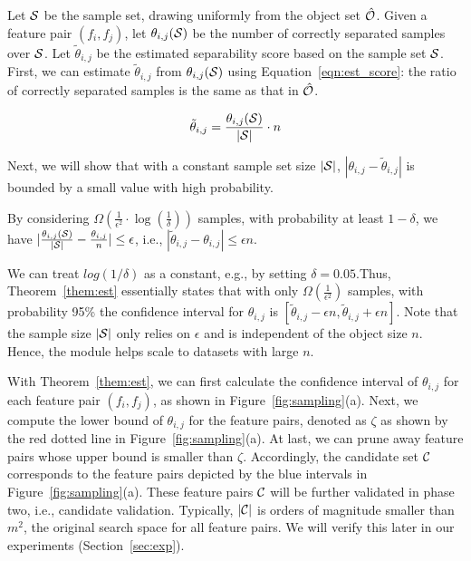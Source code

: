 Let $\sss$ be the sample set, drawing uniformly from the object set $\hat{\oo}$. Given a feature pair $(f_i,f_j)$, let $\theta_{i,j}(\sss)$ be the number of correctly separated samples over $\sss$. Let $\tilde{\theta}_{i,j}$ be the estimated separability score based on the sample set $\sss$. First, we can estimate $\tilde{\theta}_{i,j}$ from $\theta_{i,j}(\sss)$ using Equation~\ref{eqn:est_score}: the ratio of correctly separated samples is the same as that in $\hat{\oo}$. 

\begin{equation}\label{eqn:est_score}
\tilde{\theta}_{i,j} = \frac{\theta_{i,j}(\sss)}{|\sss|} \cdot n
\end{equation}

Next, we will show that with a constant sample set size $|\sss|$, $|\theta_{i,j}-\tilde{\theta}_{i,j}|$ is bounded by a small value with high probability. 

\begin{theorem}\label{them:est}
By considering $\Omega(\frac{1}{\epsilon^2}\cdot \log(\frac{1}{\delta}))$ samples, with probability at least $1-\delta$, we have $|\frac{\theta_{i,j}(\sss)}{|\sss|}-\frac{\theta_{i,j}}{n}| \leq \epsilon$, i.e., $|\tilde{\theta}_{i,j}-\theta_{i,j}|\leq \epsilon n$.
\end{theorem}

We can treat $log(1/\delta)$ as a constant, e.g., by setting $\delta = 0.05$.Thus, Theorem~\ref{them:est} essentially states that with only $\Omega(\frac{1}{\epsilon^2})$ samples, with probability 95\% the confidence interval for $\theta_{i,j}$ is $[\tilde{\theta}_{i,j}-\epsilon n, \tilde{\theta}_{i,j}+\epsilon n]$. Note that the sample size $|\sss|$ only relies on $\epsilon$ and is independent of the object size $n$. Hence, the \sampling module helps \genviz scale to datasets with large $n$. 

With Theorem~\ref{them:est}, we can first calculate the confidence interval of $\theta_{i,j}$ for each feature pair $(f_i,f_j)$, as shown in Figure~\ref{fig:sampling}(a). Next, we compute the lower bound of $\theta_{i,j}$ for the \topk feature pairs, denoted as $\zeta$ as shown by the red dotted line in Figure~\ref{fig:sampling}(a). At last, we can prune away feature pairs whose upper bound is smaller than $\zeta$. Accordingly, the candidate set $\cc$ corresponds to the feature pairs depicted by the blue intervals in Figure~\ref{fig:sampling}(a). These feature pairs $\cc$ will be further validated in phase two, i.e., candidate validation. Typically, $|\cc|$ is orders of magnitude smaller than $m^2$, the original search space for all feature pairs. We will verify this later in our experiments (Section~\ref{sec:exp}). 


